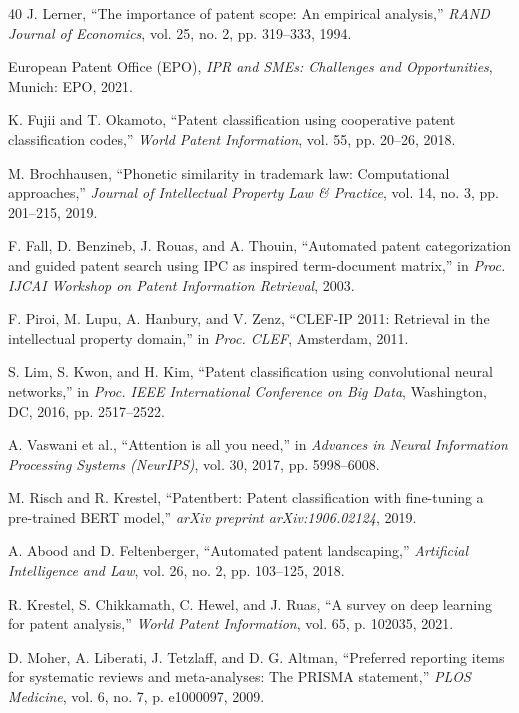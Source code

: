 \documentclass[conference]{IEEEtran}
\begin{document}
\begin{thebibliography}{40}
J. Lerner, ``The importance of patent scope: An empirical analysis,'' \textit{RAND Journal of Economics}, vol. 25, no. 2, pp. 319--333, 1994.

European Patent Office (EPO), \textit{IPR and SMEs: Challenges and Opportunities}, Munich: EPO, 2021.

K. Fujii and T. Okamoto, ``Patent classification using cooperative patent classification codes,'' \textit{World Patent Information}, vol. 55, pp. 20--26, 2018.

M. Brochhausen, ``Phonetic similarity in trademark law: Computational approaches,'' \textit{Journal of Intellectual Property Law \& Practice}, vol. 14, no. 3, pp. 201--215, 2019.

F. Fall, D. Benzineb, J. Rouas, and A. Thouin, ``Automated patent categorization and guided patent search using IPC as inspired term-document matrix,'' in \textit{Proc. IJCAI Workshop on Patent Information Retrieval}, 2003.

F. Piroi, M. Lupu, A. Hanbury, and V. Zenz, ``CLEF-IP 2011: Retrieval in the intellectual property domain,'' in \textit{Proc. CLEF}, Amsterdam, 2011.

S. Lim, S. Kwon, and H. Kim, ``Patent classification using convolutional neural networks,'' in \textit{Proc. IEEE International Conference on Big Data}, Washington, DC, 2016, pp. 2517--2522.

A. Vaswani et al., ``Attention is all you need,'' in \textit{Advances in Neural Information Processing Systems (NeurIPS)}, vol. 30, 2017, pp. 5998--6008.

M. Risch and R. Krestel, ``Patentbert: Patent classification with fine-tuning a pre-trained BERT model,'' \textit{arXiv preprint arXiv:1906.02124}, 2019.

A. Abood and D. Feltenberger, ``Automated patent landscaping,'' \textit{Artificial Intelligence and Law}, vol. 26, no. 2, pp. 103--125, 2018.

R. Krestel, S. Chikkamath, C. Hewel, and J. Ruas, ``A survey on deep learning for patent analysis,'' \textit{World Patent Information}, vol. 65, p. 102035, 2021.

D. Moher, A. Liberati, J. Tetzlaff, and D. G. Altman, ``Preferred reporting items for systematic reviews and meta-analyses: The PRISMA statement,'' \textit{PLOS Medicine}, vol. 6, no. 7, p. e1000097, 2009.


\end{thebibliography}
\end{document}
